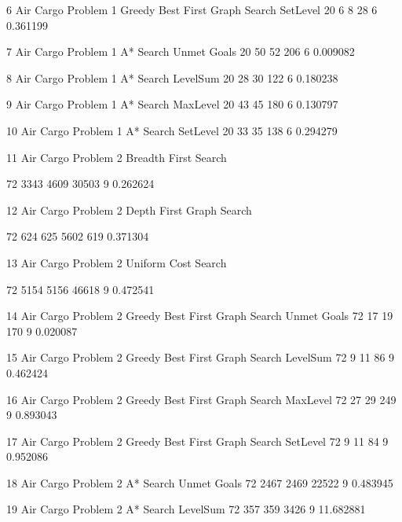 \documentclass{article}
\begin{document}
    
      6
      Air Cargo Problem 1
      Greedy Best First Graph Search
      SetLevel
      20
      6
      8
      28
      6
      0.361199
    
    
      7
      Air Cargo Problem 1
      A* Search
      Unmet Goals
      20
      50
      52
      206
      6
      0.009082
    
    
      8
      Air Cargo Problem 1
      A* Search
      LevelSum
      20
      28
      30
      122
      6
      0.180238
    
    
      9
      Air Cargo Problem 1
      A* Search
      MaxLevel
      20
      43
      45
      180
      6
      0.130797
    
    
      10
      Air Cargo Problem 1
      A* Search
      SetLevel
      20
      33
      35
      138
      6
      0.294279
    
    
      11
      Air Cargo Problem 2
      Breadth First Search
      
      72
      3343
      4609
      30503
      9
      0.262624
    
    
      12
      Air Cargo Problem 2
      Depth First Graph Search
      
      72
      624
      625
      5602
      619
      0.371304
    
    
      13
      Air Cargo Problem 2
      Uniform Cost Search
      
      72
      5154
      5156
      46618
      9
      0.472541
    
    
      14
      Air Cargo Problem 2
      Greedy Best First Graph Search
      Unmet Goals
      72
      17
      19
      170
      9
      0.020087
    
    
      15
      Air Cargo Problem 2
      Greedy Best First Graph Search
      LevelSum
      72
      9
      11
      86
      9
      0.462424
    
    
      16
      Air Cargo Problem 2
      Greedy Best First Graph Search
      MaxLevel
      72
      27
      29
      249
      9
      0.893043
    
    
      17
      Air Cargo Problem 2
      Greedy Best First Graph Search
      SetLevel
      72
      9
      11
      84
      9
      0.952086
    
    
      18
      Air Cargo Problem 2
      A* Search
      Unmet Goals
      72
      2467
      2469
      22522
      9
      0.483945
    
    
      19
      Air Cargo Problem 2
      A* Search
      LevelSum
      72
      357
      359
      3426
      9
      11.682881
    
\end{document}
